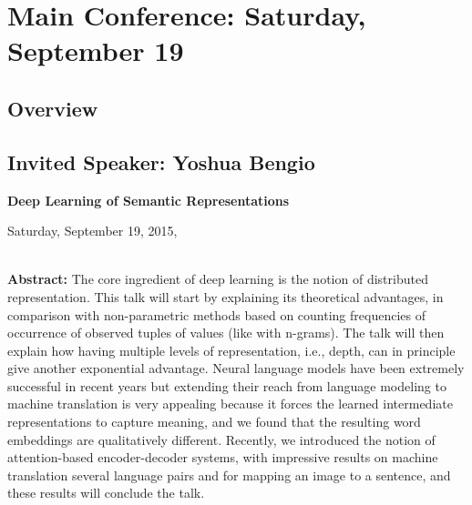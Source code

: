 
\chapter{Main Conference: Saturday, September 19}

\thispagestyle{emptyheader}


\section*{Overview}



\clearpage{}


\section{Invited Speaker: Yoshua Bengio}


\begin{center}
\textbf{\Large{}Deep Learning of Semantic Representations}{\Large{}\vspace{1em}
}
\par\end{center}{\Large \par}

\begin{center}
Saturday, September 19, 2015,  \vspace{1em}
\\
 \PlenaryLoc \\
 \vspace{1em}

\par\end{center}

\noindent \textbf{Abstract:} The core ingredient of deep learning
is the notion of distributed representation. This talk will start
by explaining its theoretical advantages, in comparison with non-parametric
methods based on counting frequencies of occurrence of observed tuples
of values (like with n-grams). The talk will then explain how having
multiple levels of representation, i.e., depth, can in principle give
another exponential advantage. Neural language models have been extremely
successful in recent years but extending their reach from language
modeling to machine translation is very appealing because it forces
the learned intermediate representations to capture meaning, and we
found that the resulting word embeddings are qualitatively different.
Recently, we introduced the notion of attention-based encoder-decoder
systems, with impressive results on machine translation several language
pairs and for mapping an image to a sentence, and these results will
conclude the talk.

